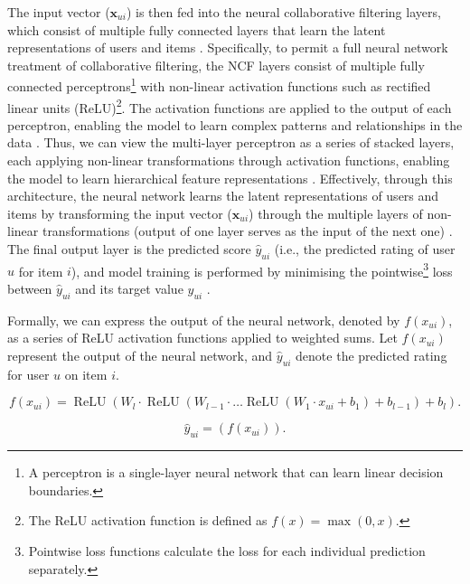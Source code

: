  The input vector ($\mathbf{x}_{ui}$) is then fed into the neural collaborative filtering layers, which consist of multiple fully connected layers that learn the latent representations of users and items \cite{he2017neural}. Specifically, to permit a full neural network treatment of collaborative filtering, the NCF layers consist of multiple fully connected perceptrons\footnote{A perceptron is a single-layer neural network that can learn linear decision boundaries.} with non-linear activation functions such as rectified linear units (ReLU)\footnote{ The ReLU activation function is defined as $f(x) = \max(0, x)$.}. The activation functions are applied to the output of each perceptron, enabling the model to learn complex patterns and relationships in the data \cite{he2017neural}. Thus, we can view the multi-layer perceptron as a series of stacked layers, each applying non-linear transformations through activation functions, enabling the model to learn hierarchical feature representations  \cite{steck2021deep}. Effectively, through this architecture, the neural network learns the latent representations of users and items by transforming the input vector ($\mathbf{x}_{ui}$) through the multiple layers of non-linear transformations (output of one layer serves as the input of the next one) \cite{he2017neural}. The final output layer is the predicted score $\hat{y}_{u i}$ (i.e., the predicted rating of user $u$ for item $i$), and model training is performed by minimising the pointwise\footnote{Pointwise loss functions calculate the loss for each individual prediction separately.} loss between $\hat{y}_{u i}$ and its target value $y_{u i}$ \cite{he2017neural}.
 

 Formally, we can express the output of the neural network, denoted by $f\left(x_{u i}\right)$, as a series of ReLU activation functions applied to weighted sums. Let $f\left(x_{u i}\right)$ represent the output of the neural network, and $\hat{y}_ {u i}$ denote the predicted rating for user $u$ on item $i$.

\begin{equation}
    \label{eq:NCF layers output}
    f\left(x_{ui}\right) = \operatorname{ReLU}\left(W_l \cdot \operatorname{ReLU}\left(W_{l-1} \cdot \ldots \operatorname{ReLU}\left(W_1 \cdot x_{ui} + b_1\right) + b_{l-1}\right) + b_l\right).
\end{equation}
    
\begin{equation}
    \label{eq:output layer prediction}
    \hat{y}_{ui} = \left(f\left(x_{ui}\right)\right).
\end{equation}


